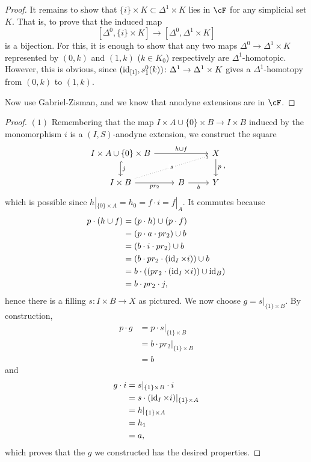 \documentclass[a4paper,11pt,openany]{scrartcl}
\begin{document}
\begin{proof}
It remains to show that $\{i\}\times K\subset\Delta^1\times K$ lies in $\cF$ for any simplicial set $K$. That is, to prove that the induced map
\[
[\Delta^0,\{i\}\times K]\to[\Delta^0,\Delta^1\times K]
\]
is a bijection. For this, it is enough to show that any two maps $\Delta^0\to\Delta^1\times K$ represented by $(0,k)$ and $(1,k)$ ($k\in K_0$) respectively are $\Delta^1$-homotopic. However, this is obvious, since $(\operatorname{id}_{[1]},s^0_1(k))\colon\Delta^1\to\Delta^1\times K$ gives a $\Delta^1$-homotopy from $(0,k)$ to $(1,k)$.

Now use Gabriel-Zisman, and we know that anodyne extensions are in $\cF$.
\end{proof}

\begin{proof}
    $(1)$ Remembering that the map $I\times A\cup\{0\}\times B\rightarrow
    I\times B$ induced by the monomorphism $i$ is a $(I,S)$-anodyne extension,
    we construct the square
    \[\begin{tikzcd}
        {I\times A\cup\{0\}\times B} && X \\
        {I\times B} & B & Y
        \arrow["{h\cup f}", from=1-1, to=1-3]
        \arrow["{j}", hook, from=1-1, to=2-1]
        \arrow["{pr_2}"', from=2-1, to=2-2]
        \arrow["b"', from=2-2, to=2-3]
        \arrow["p", from=1-3, to=2-3]
        \arrow["s"{description}, dotted, from=2-1, to=1-3]
    \end{tikzcd},\]
    which is possible since $h|_{\{0\}\times A}=h_0=f\cdot i=f|_A$. It commutes
    because
    \begin{align*}
        p\cdot(h\cup f) &=(p\cdot h)\cup (p\cdot f) \\
        &=(p\cdot a\cdot pr_2)\cup b \\
        &=(b\cdot i\cdot pr_2)\cup b \\
        &=(b\cdot pr_2\cdot(\operatorname{id}_I\times i))\cup b \\
        &=b\cdot((pr_2\cdot(\operatorname{id}_I\times i))\cup\operatorname{id}_B) \\
        &=b\cdot pr_2\cdot j,
    \end{align*}
    hence there is a filling $s\colon I\times B\rightarrow X$ as pictured.
    We now choose $g=s|_{\{1\}\times B}$. By construction,
    \begin{align*}
        p\cdot g &=p\cdot s|_{\{1\}\times B} \\
        &=b\cdot pr_2|_{\{1\}\times B} \\
        &=b
    \end{align*}
    and
    \begin{align*}
        g\cdot i &=s|_{\{1\}\times B}\cdot i \\
        &=s\cdot(\operatorname{id}_I\times i)|_{\{1\}\times A} \\
        &=h|_{\{1\}\times A} \\
        &=h_1 \\
        &=a,
    \end{align*}
    which proves that the $g$ we constructed has the desired properties.


\end{proof}
\end{document}
